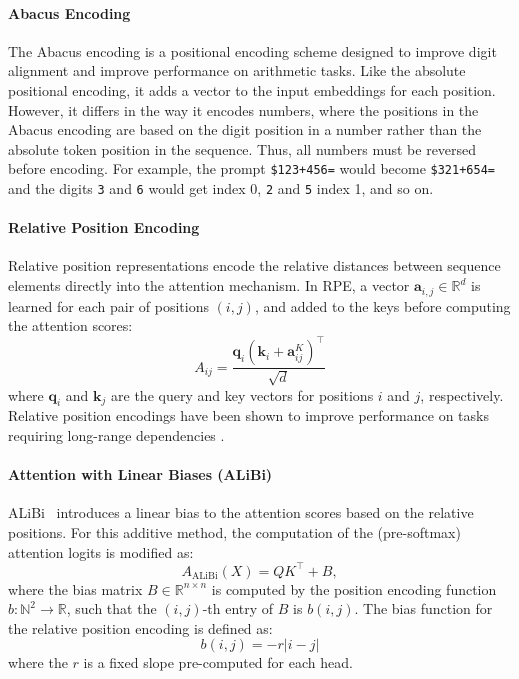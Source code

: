 \paragraph{Abacus Encoding}\label{subsec:abacus_enc}
The Abacus encoding \parencite{mcleish_transformers_2024} is a positional encoding scheme designed to improve digit alignment and improve performance on arithmetic tasks. Like the absolute positional encoding, it adds a vector to the input embeddings for each position. However, it differs in the way it encodes numbers, where the positions in the Abacus encoding are based on the digit position in a number rather than the absolute token position in the sequence. Thus, all numbers must be reversed before encoding. For example, the prompt \texttt{\$123+456=} would become \texttt{\$321+654=} and the digits \texttt{3} and \texttt{6} would get index 0, \texttt{2} and \texttt{5} index 1, and so on.

\paragraph{Relative Position Encoding}\label{subsec:relative_pos_enc}
Relative position representations \parencite{shaw_self-attention_2018} encode the relative distances between sequence elements directly into the attention mechanism. In RPE, a vector $\mathbf{a}_{i, j} \in \mathbb{R}^d$ is learned for each pair of positions $(i, j)$, and added to the keys before computing the attention scores:
\begin{equation*}
    A_{ij} = \frac{\mathbf{q}_i (\mathbf{k}_i + \mathbf{a}_{ij}^K)^\top}{\sqrt{d}}
\end{equation*}
where $\mathbf{q}_i$ and $\mathbf{k}_j$ are the query and key vectors for positions $i$ and $j$, respectively. Relative position encodings have been shown to improve performance on tasks requiring long-range dependencies \parencite{shaw_self-attention_2018}.

\paragraph{Attention with Linear Biases (ALiBi)}\label{subsec:alibi}
ALiBi~\parencite{press_train_2021} introduces a linear bias to the attention scores based on the relative positions. For this additive method, the computation of the (pre-softmax) attention logits is modified as:
\begin{equation*}
    A_{\text{ALiBi}}(X) = Q K^\top + B,
\end{equation*}
where the bias matrix $B \in \mathbb{R}^{n \times n}$ is computed by the position encoding function $b : \mathbb{N}^2 \to \mathbb{R}$, such that the $(i,j)$-th entry of $B$ is $b(i,j)$. The bias function for the relative position encoding is defined as:
\begin{equation*}
    b(i,j) = -r|i - j|
\end{equation*}
where the $r$ is a fixed slope pre-computed for each head.

